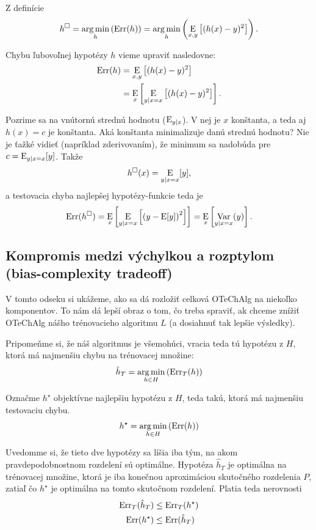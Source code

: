 Z definície
$$h^{\square} = \operatorname*{{arg\,min}}_h \left( \mathrm{Err}(h) \right) = \operatorname*{{arg\,min}}_h \left( \operatorname*{\mathrm{E}}_{x,y} \left[ (h(x) - y)^2 \right] \right).$$

Chybu ľubovoľnej hypotézy $h$ vieme upraviť nasledovne:
\begin{align}
  \mathrm{Err}(h)
    &= \operatorname*{\mathrm{E}}_{x,y} \left[ (h(x) - y)^2 \right] \\
    &= \operatorname*{\mathrm{E}}_x \left[ \operatorname*{\mathrm{E}}_{y|x=x} \left[ (h(x) - y)^2 \right] \right].
\end{align}

Pozrime sa na vnútornú strednú hodnotu ($\operatorname*{\mathrm{E}}_{y|x}$). V nej je $x$ konštanta, a
teda aj $h(x) = c$ je konštanta. Aká konštanta minimalizuje danú
strednú hodnotu? Nie je ťažké vidieť (napríklad zderivovaním), že
minimum sa nadobúda pre $c = \operatorname*{\mathrm{E}}_{y|x=x}[y]$. Takže
$$h^{\square}(x) = \operatorname*{\mathrm{E}}_{y|x=x}[y],$$
a testovacia chyba najlepšej hypotézy-funkcie teda je
$$\mathrm{Err}(h^{\square}) = \operatorname*{\mathrm{E}}_{x} \left[ \operatorname*{\mathrm{E}}_{y|x=x} \left[ \left( y - \operatorname*{\mathrm{E}}[y] \right)^2 \right] \right] = \operatorname*{\mathrm{E}}_{x} \left[ \operatorname*{\mathrm{Var}}_{y|x=x}(y) \right].$$



\subsection{Kompromis medzi výchylkou a rozptylom (bias-complexity tradeoff)}

V tomto odseku si ukážeme, ako sa dá rozložiť celková OTeChAlg na niekoľko
komponentov. To nám dá lepší obraz o tom, čo treba spraviť, ak chceme
znížiť OTeChAlg nášho trénovacieho algoritmu $L$ (a dosiahnuť tak lepšie výsledky).

Pripomeňme si, že náš algoritmus je všemohúci, vracia teda tú hypotézu z $H$,
ktorá má najmenšiu chybu na trénovacej množine:
$$ \hat{h}_T = \operatorname*{{arg\,min}}_{h \in H} \left( \mathrm{Err}_T(h) \right) $$

Označme $h^\star$ objektívne najlepšiu hypotézu z $H$, teda takú,
ktorá má najmenšiu testovaciu chybu.
$$ h^\star = \operatorname*{{arg\,min}}_{h \in H} \left( \mathrm{Err}(h) \right) $$

Uvedomme si, že tieto dve hypotézy sa líšia iba tým, na akom
pravdepodobnostnom rozdelení sú optimálne. Hypotéza $\hat{h}_T$
je optimálna na trénovacej množine, ktorá je iba konečnou aproximáciou
skutočného rozdelenia $P$, zatiaľ čo $h^\star$ je optimálna na tomto
skutočnom rozdelení. Platia teda nerovnosti
\begin{align*}
  \mathrm{Err}_T(\hat{h}_T) &\leq \mathrm{Err}_T(h^\star) \\
  \mathrm{Err}(h^\star) &\leq \mathrm{Err}(\hat{h}_T)
\end{align*}

